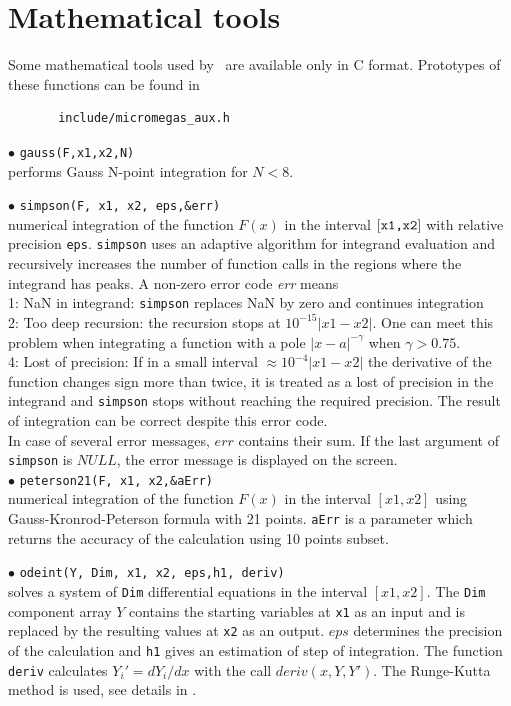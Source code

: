 \documentclass[12pt,a4paper]{article}
\begin{document}
\section{Mathematical tools}

Some mathematical tools used by \micro\ are available only 
in C format. Prototypes of these functions can be found in
\begin{verbatim}
       include/micromegas_aux.h 
\end{verbatim}

\noindent$\bullet$ \verb|gauss(F,x1,x2,N)|\\
performs Gauss N-point integration for $N<8$.  


\noindent$\bullet$ \verb|simpson(F, x1, x2, eps,&err)|\\
numerical integration of the function $F(x)$ in the interval $[\verb|x1,x2|]$  
with relative precision \verb|eps|. \verb|simpson| uses an adaptive algorithm 
for integrand evaluation and  recursively increases the number of function calls in 
the regions where the  integrand has peaks. A non-zero error code {\it err} means\\
1: NaN in integrand:  \verb|simpson| replaces NaN by zero and continues integration\\
2: Too deep recursion: the recursion stops at  $10^{-15}|x1-x2|$. One can meet this problem when integrating 
a function with a pole $|x-a|^{-\gamma}$ when $\gamma > 0.75$.  \\
4: Lost of precision:   If in a small interval $\approx 10^{-4}|x1-x2|$ the derivative of the 
function  changes  sign more than twice, it is treated as a lost of precision in the integrand and  \verb|simpson| stops without reaching 
the  required  precision. The result of integration can be  correct despite this error code.\\
In case of several error messages, $err$ contains their sum.  If the last argument of \verb|simpson| is $NULL$, the error message is displayed on  the screen.  \\

\noindent$\bullet$ \verb|peterson21(F, x1, x2,&aErr)|\\
numerical integration of the function $F(x)$ in the interval $[x1,x2]$ using Gauss-Kronrod-Peterson formula with 21 points. {\tt aErr} is a  parameter which returns the accuracy of the calculation using 10 points subset.  


\noindent$\bullet$ \verb|odeint(Y, Dim, x1, x2, eps,h1, deriv)|\\
solves a  system of \verb|Dim| differential  equations in the interval 
$[x1,x2]$. The  \verb|Dim| component array $Y$ contains the starting variables at \verb|x1| as an input and is replaced by the
resulting values at \verb|x2| as an output. $eps$ determines the precision of the 
calculation and  \verb|h1| gives an estimation of step of integration.  
The function \verb|deriv| calculates 
$Y_i' = dY_i/dx$ with the call $deriv(x,Y,Y')$. The Runge-Kutta method is
used, see details in \cite{Numerical}. 
\end{document}
